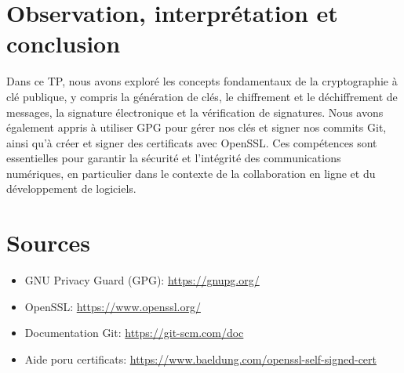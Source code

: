 \documentclass[12pt,a4paper]{article}
\begin{document}
\section{Observation, interprétation et conclusion}
Dans ce TP, nous avons exploré les concepts fondamentaux de la cryptographie à clé publique,
y compris la génération de clés, le chiffrement et le déchiffrement de messages,
la signature électronique et la vérification de signatures.
Nous avons également appris à utiliser GPG pour gérer nos clés et signer nos commits Git,
ainsi qu'à créer et signer des certificats avec OpenSSL.
Ces compétences sont essentielles pour garantir la sécurité et l'intégrité des communications numériques,
en particulier dans le contexte de la collaboration en ligne et du développement de logiciels.

\section{Sources}
\begin{itemize}
    \item GNU Privacy Guard (GPG): \url{https://gnupg.org/}
    \item OpenSSL: \url{https://www.openssl.org/}
    \item Documentation Git: \url{https://git-scm.com/doc}
    \item Aide poru certificats: \url{https://www.baeldung.com/openssl-self-signed-cert}
\end{itemize}
\end{document}
